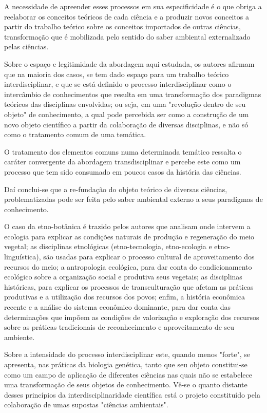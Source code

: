 \documentclass[
   article,       %
   12pt,          %
   oneside,       %
   a4paper,       %
   english,       %
   brazil,           %
   sumario=tradicional
   ]{abntex2}
\begin{document}
A necessidade de apreender esses processos em sua especificidade é o que obriga a reelaborar os conceitos teóricos de cada ciência e a produzir novos conceitos a partir do trabalho teórico sobre os conceitos importados de outras ciências, transformação que é mobilizada pelo sentido do saber ambiental externalizado pelas ciências.

Sobre o espaço e legitimidade da abordagem aqui estudada, os autores afirmam que na maioria dos casos, se tem dado espaço para um trabalho teórico interdisciplinar, e que se está definido o processo interdisciplinar como o intercâmbio de conhecimentos que resulta em uma transformação dos paradigmas teóricos das disciplinas envolvidas; ou seja, em uma "revolução dentro de seu objeto" de conhecimento, a qual pode percebida ser como a construção de um novo objeto científico a partir da colaboração de diversas disciplinas, e não só como o tratamento comum de uma temática.

O tratamento dos elementos comuns numa determinada temático ressalta o caráter convergente da abordagem transdisciplinar e percebe este como um processo que tem sido consumado em poucos casos da história das ciências.

Daí conclui-se que a re-fundação do objeto teórico de diversas ciências, problematizadas pode ser feita pelo saber ambiental externo a seus paradigmas de conhecimento. 

O caso da etno-botânica é trazido pelos autores que analisam onde intervem a ecologia para explicar as condições naturais de produção e regeneração do meio vegetal; as disciplinas etnológicas (etno-tecnologia, etno-ecologia e etno-linguística), são usadas para explicar o processo cultural de aproveitamento dos recursos do meio; a antropologia ecológica, para dar conta do condicionamento ecológico sobre a organização social e produtiva seus vegetais; as disciplinas históricas, para explicar os processos de transculturação que afetam as práticas produtivas e a utilização dos recursos dos povos; enfim, a história econômica recente e a análise do sistema econômico dominante, para dar conta das determinações que impõem as condições de valorização e exploração dos recursos sobre as práticas tradicionais de reconhecimento e aproveitamento de seu ambiente.

Sobre a intensidade do processo interdisciplinar este, quando menos "forte", se apresenta, nas práticas da biologia genética, tanto que seu objeto constitui-se como um campo de aplicação de diferentes ciências nas quais não se estabelece uma transformação de seus objetos de conhecimento.
Vê-se o quanto distante desses princípios da interdisciplinaridade científica está o projeto constituído pela colaboração de umas supostas "ciências ambientais".
\end{document}
